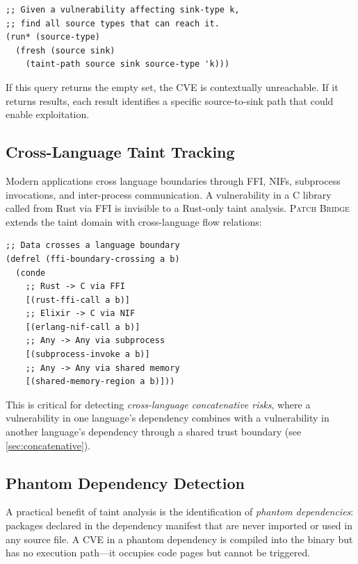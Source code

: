 \documentclass[11pt,twocolumn]{article}
\begin{document}
\begin{lstlisting}[language=miniKanren,caption={Backward reachability query},label=lst:kanren-backward]
;; Given a vulnerability affecting sink-type k,
;; find all source types that can reach it.
(run* (source-type)
  (fresh (source sink)
    (taint-path source sink source-type 'k)))
\end{lstlisting}

If this query returns the empty set, the CVE is contextually
unreachable. If it returns results, each result identifies a specific
source-to-sink path that could enable exploitation.

\subsection{Cross-Language Taint Tracking}

Modern applications cross language boundaries through FFI, NIFs,
subprocess invocations, and inter-process communication. A
vulnerability in a C library called from Rust via FFI is invisible to a
Rust-only taint analysis. \textsc{Patch Bridge} extends the taint domain
with cross-language flow relations:

\begin{lstlisting}[language=miniKanren,caption={Cross-language boundary relations},label=lst:kanren-crosslang]
;; Data crosses a language boundary
(defrel (ffi-boundary-crossing a b)
  (conde
    ;; Rust -> C via FFI
    [(rust-ffi-call a b)]
    ;; Elixir -> C via NIF
    [(erlang-nif-call a b)]
    ;; Any -> Any via subprocess
    [(subprocess-invoke a b)]
    ;; Any -> Any via shared memory
    [(shared-memory-region a b)]))
\end{lstlisting}

This is critical for detecting \emph{cross-language concatenative
risks}, where a vulnerability in one language's dependency combines
with a vulnerability in another language's dependency through a shared
trust boundary (see \cref{sec:concatenative}).

\subsection{Phantom Dependency Detection}

A practical benefit of taint analysis is the identification of
\emph{phantom dependencies}: packages declared in the dependency
manifest that are never imported or used in any source file. A CVE
in a phantom dependency is compiled into the binary but has no
execution path---it occupies code pages but cannot be triggered.
\end{document}
